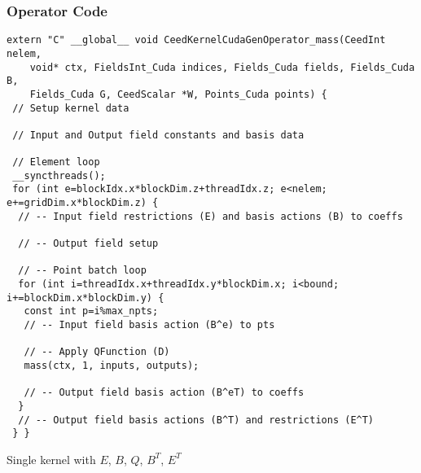 \documentclass{beamer}
\begin{document}

\begin{frame}[fragile]
\begin{center}
\frametitle{Operator Code}

{\tiny
\begin{lstlisting}[style=boxedC]
extern "C" __global__ void CeedKernelCudaGenOperator_mass(CeedInt nelem,
    void* ctx, FieldsInt_Cuda indices, Fields_Cuda fields, Fields_Cuda B,
    Fields_Cuda G, CeedScalar *W, Points_Cuda points) {
 // Setup kernel data

 // Input and Output field constants and basis data

 // Element loop
 __syncthreads();
 for (int e=blockIdx.x*blockDim.z+threadIdx.z; e<nelem; e+=gridDim.x*blockDim.z) {
  // -- Input field restrictions (E) and basis actions (B) to coeffs

  // -- Output field setup

  // -- Point batch loop
  for (int i=threadIdx.x+threadIdx.y*blockDim.x; i<bound; i+=blockDim.x*blockDim.y) {
   const int p=i%max_npts;
   // -- Input field basis action (B^e) to pts

   // -- Apply QFunction (D)
   mass(ctx, 1, inputs, outputs);

   // -- Output field basis action (B^eT) to coeffs
  }
  // -- Output field basis actions (B^T) and restrictions (E^T)
 } }
\end{lstlisting}
}

Single kernel with $E$, $B$, $Q$, $B^T$, $E^T$\\

\end{center}
\end{frame}

\end{document}
